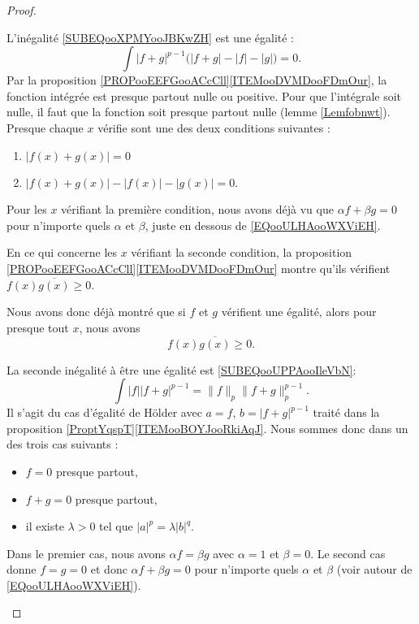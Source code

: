 \begin{proof}
\begin{subproof}
		L'inégalité \eqref{SUBEQooXPMYooJBKwZH} est une égalité :
		\begin{equation}
			\int | f+g |^{p-1}\big( | f+g |-| f |-| g | \big)=0.
		\end{equation}
		Par la proposition \ref{PROPooEEFGooACcCll}\ref{ITEMooDVMDooFDmOur}, la fonction intégrée est presque partout nulle ou positive. Pour que l'intégrale soit nulle, il faut que la fonction soit presque partout nulle (lemme \ref{Lemfobnwt}). Presque chaque \( x\) vérifie sont une des deux conditions suivantes :
		\begin{enumerate}
			\item
			      \( | f(x)+g(x) |=0\)
			\item
			      \( | f(x)+g(x) |-| f(x) |-| g(x) |=0\).
		\end{enumerate}
		Pour les \( x\) vérifiant la première condition, nous avons déjà vu que \( \alpha f+\beta g=0\) pour n'importe quels \( \alpha\) et \( \beta\), juste en dessous de \eqref{EQooULHAooWXViEH}.

		En ce qui concerne les \( x\) vérifiant la seconde condition, la proposition \ref{PROPooEEFGooACcCll}\ref{ITEMooDVMDooFDmOur} montre qu'ils vérifient \( f(x)\overline{g(x)}\geq 0\).

		Nous avons donc déjà montré que si \( f\) et \( g\) vérifient une égalité, alors pour presque tout \( x\), nous avons
		\begin{equation}
			f(x)\overline{g(x)}\geq 0.
		\end{equation}


		La seconde inégalité à être une égalité est \eqref{SUBEQooUPPAooIleVbN}:
		\begin{equation}
			\int | f || f+g |^{p-1}=\| f \|_p\| f+g \|_p^{p-1}.
		\end{equation}
		Il s'agit du cas d'égalité de Hölder avec \( a=f\), \( b=| f+g |^{p-1}\) traité dans la proposition \ref{ProptYqspT}\ref{ITEMooBOYJooRkiAqJ}. Nous sommes donc dans un des trois cas suivants :
		\begin{itemize}
			\item \( f=0\) presque partout,
			\item \( f+g=0\) presque partout,
			\item il existe \( \lambda>0\) tel que \( | a |^p=\lambda | b |^q\).
		\end{itemize}
		Dans le premier cas, nous avons \( \alpha f=\beta g\) avec \( \alpha=1\) et \( \beta=0\). Le second cas donne \( f=g=0\) et donc \( \alpha f+\beta g=0\) pour n'importe quels \( \alpha\) et \( \beta\) (voir autour de \eqref{EQooULHAooWXViEH}).


\end{subproof}
\end{proof}
